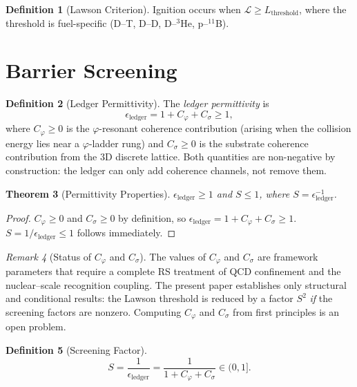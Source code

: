 \documentclass[12pt,a4paper]{article}
\newtheorem{theorem}{Theorem}[section]
\theoremstyle{definition}
\newtheorem{definition}[theorem]{Definition}
\theoremstyle{remark}
\newtheorem{remark}[theorem]{Remark}
\begin{document}
\begin{definition}[Lawson Criterion]
Ignition occurs when
$\mathcal{L} \geq L_{\mathrm{threshold}}$, where the threshold is
fuel-specific (D--T, D--D, D--${}^3$He, p--${}^{11}$B).
\end{definition}

\section{Barrier Screening}

\begin{definition}[Ledger Permittivity]
\label{def:ledger-perm}
The \emph{ledger permittivity} is
\begin{equation}
  \epsilon_{\mathrm{ledger}} = 1 + C_\varphi + C_\sigma \geq 1,
\end{equation}
where $C_\varphi \geq 0$ is the $\varphi$-resonant coherence
contribution (arising when the collision energy lies near a
$\varphi$-ladder rung) and $C_\sigma \geq 0$ is the substrate
coherence contribution from the 3D discrete lattice.  Both
quantities are non-negative by construction: the ledger can only
add coherence channels, not remove them.
\end{definition}

\begin{theorem}[Permittivity Properties]
\label{thm:perm}
$\epsilon_{\mathrm{ledger}} \geq 1$ and $S \leq 1$,
where $S = \epsilon_{\mathrm{ledger}}^{-1}$.
\end{theorem}

\begin{proof}
$C_\varphi \geq 0$ and $C_\sigma \geq 0$ by definition, so
$\epsilon_{\mathrm{ledger}} = 1 + C_\varphi + C_\sigma \geq 1$.
$S = 1/\epsilon_{\mathrm{ledger}} \leq 1$ follows immediately.
\end{proof}

\begin{remark}[Status of $C_\varphi$ and $C_\sigma$]
\label{rem:cgamma}
The values of $C_\varphi$ and $C_\sigma$ are framework parameters
that require a complete RS treatment of QCD confinement and the
nuclear--scale recognition coupling.  The present paper establishes
only structural and conditional results: the Lawson threshold is
reduced by a factor $S^2$ \emph{if} the screening factors are
nonzero.  Computing $C_\varphi$ and $C_\sigma$ from first principles
is an open problem.
\end{remark}

\begin{definition}[Screening Factor]
\label{def:screening}
\begin{equation}
  S = \frac{1}{\epsilon_{\mathrm{ledger}}} = \frac{1}{1 + C_\varphi
  + C_\sigma} \in (0, 1].
\end{equation}
\end{definition}
\end{document}
